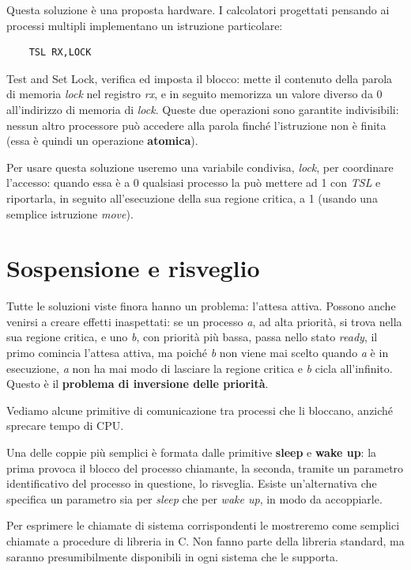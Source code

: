 Questa soluzione è una proposta hardware. I calcolatori progettati pensando ai processi multipli implementano un istruzione particolare:
\begin{verbatim}
    TSL RX,LOCK
\end{verbatim}
Test and Set Lock, verifica ed imposta il blocco: mette il contenuto della parola di memoria \textit{lock} nel registro \textit{rx}, e in seguito memorizza un valore diverso da 0 all'indirizzo di memoria di \textit{lock}. Queste due operazioni sono garantite indivisibili: nessun altro processore può accedere alla parola finché l'istruzione non è finita (essa è quindi un operazione \textbf{atomica}).

Per usare questa soluzione useremo una variabile condivisa, \textit{lock}, per coordinare l'accesso: quando essa è a 0 qualsiasi processo la può mettere ad 1 con \textit{TSL} e riportarla, in seguito all'esecuzione della sua regione critica, a 1 (usando una semplice istruzione \textit{move}).




\section{Sospensione e risveglio}

Tutte le soluzioni viste finora hanno un problema: l'attesa attiva. Possono anche venirsi a creare effetti inaspettati: se un processo \textit{a}, ad alta priorità, si trova nella sua regione critica, e uno \textit{b}, con priorità più bassa, passa nello stato \textit{ready}, il primo comincia l'attesa attiva, ma poiché \textit{b} non viene mai scelto quando \textit{a} è in esecuzione, \textit{a} non ha mai modo di lasciare la regione critica e \textit{b} cicla all'infinito. Questo è il \textbf{problema di inversione delle priorità}.

Vediamo alcune primitive di comunicazione tra processi che li bloccano, anziché sprecare tempo di CPU.

Una delle coppie più semplici è formata dalle primitive \textbf{sleep} e \textbf{wake up}: la prima provoca il blocco del processo chiamante, la seconda, tramite un parametro identificativo del processo in questione, lo risveglia. Esiste un'alternativa che specifica un parametro sia per \textit{sleep} che per \textit{wake up}, in modo da accoppiarle.

Per esprimere le chiamate di sistema corrispondenti le mostreremo come semplici chiamate a procedure di libreria in C. Non fanno parte della libreria standard, ma saranno presumibilmente disponibili in ogni sistema che le supporta.

